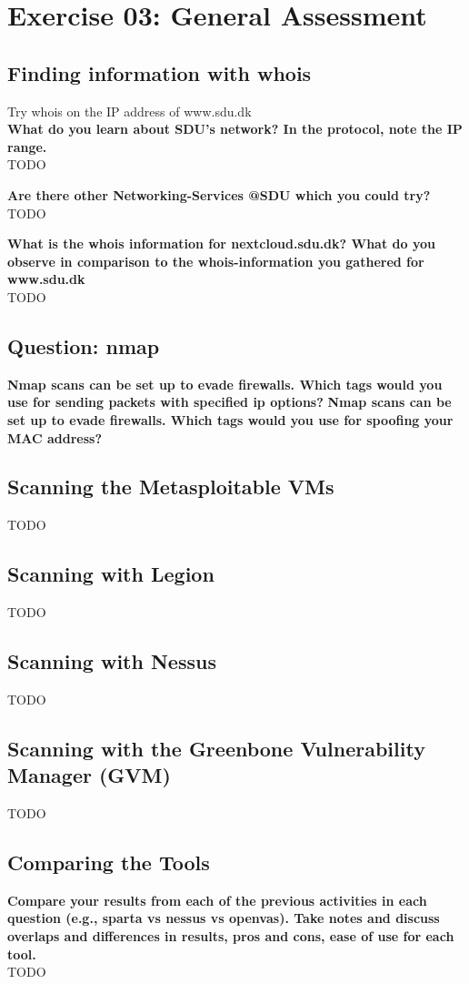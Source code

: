 \section*{Exercise 03: General Assessment}

\subsection*{Finding information with whois}
Try whois on the IP address of www.sdu.dk\\
\textbf{\dag What do you learn about SDU's network? In the protocol, note the IP range.}\\
TODO

\textbf{Are there other Networking-Services @SDU which you could try?}\\
TODO

\textbf{\dag What is the whois information for nextcloud.sdu.dk? What do you observe in comparison to the whois-information you gathered for www.sdu.dk}\\
TODO

\subsection*{Question: nmap}
\textbf{\dag Nmap scans can be set up to evade firewalls. Which tags would you use for sending packets with specified ip options?}
\textbf{\dag Nmap scans can be set up to evade firewalls. Which tags would you use for spoofing your MAC address?}

\subsection*{Scanning the Metasploitable VMs}
TODO

\subsection*{Scanning with Legion}
TODO

\subsection*{Scanning with Nessus}
TODO

\subsection*{Scanning with the Greenbone Vulnerability Manager (GVM)}
TODO

\subsection*{Comparing the Tools}
\textbf{\dag Compare your results from each of the previous activities in each question (e.g., sparta vs nessus vs openvas). Take notes and discuss overlaps and differences in results, pros and cons, ease of use for each tool.}\\
TODO

